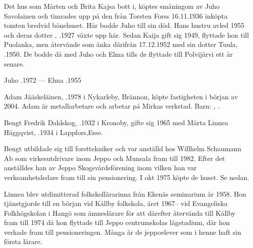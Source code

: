 Det hus som Mårten och Brita Kajsa bott i, köptes småningom av Juho Savolainen och timrades upp på den från Torsten Forss 16.11.1936 inköpta tomten bredvid bönehuset. Här bodde Juho till sin död. Hans hustru avled 1955 och deras dotter , .1927 växte upp här. Sedan Kaija gift sig 1949, flyttade hon till Puolanka, men återvände som änka därifrån 17.12.1952 med sin dotter Tuula, .1950. De bodde då med Juho och Elma tills de flyttade till Polvijärvi ett år senare.

Juho .1972  ---  Elma .1955





Adam Jääskeläinen, .1978 i Nykarleby, Brännon, köpte fastigheten i början av 2004. Adam är metallarbetare och arbetar på Mirkas verkstad.
Barn: , .\jhvspace{}


Bengt Fredrik Dahlskog, .1932 i Kronoby, gifte sig 1965 med Märta Linnea Häggqvist, .1934 i Lappfors,Esse.

Bengt utbildade sig till forsttekniker och var anställd hos Willhelm Schaumann Ab som virkesutdrivare inom Jeppo och Munsala fram till 1982. Efter det anställdes han av Jeppo Skogsvårdsförening inom vilken han var verksamhetsledare fram till sin pensionering. I okt 1975 köpte de huset. Se nedan.

Linnea blev utdimitterad folkskollärarinna från Ekenäs seminarium år 1958. Hon tjänstgjorde till en början vid Kållby folkskola, året 1967-- vid Evangeliska Folkhögskolan i Hangö som ämneslärare för att därefter återvända till Kållby fram till 1974 då hon flyttade till Jeppo centrumskolas lågstadium, där hon verkade fram till pensioneringen. Många är de jeppoelever som i henne haft sin första lärare.
\begin{jhchildren}
  \item {}
  \item {}
  \item {}
\end{jhchildren}

